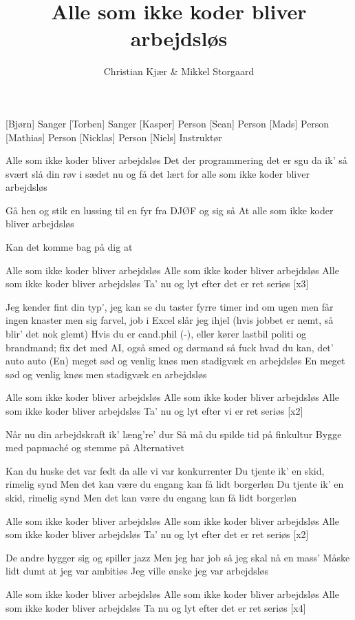 \documentclass[a4paper,11pt]{article}
\title{Alle som ikke koder bliver arbejdsløs}
\author{Christian Kjær \& Mikkel Storgaard}
\begin{document}
\maketitle

\begin{roles}
[Bjørn] Sanger
[Torben] Sanger
[Kasper] Person
[Sean] Person
[Mads] Person
[Mathias] Person
[Nicklas] Person
[Niels] Instruktør
\end{roles}

\begin{song}
%
Alle som ikke koder bliver arbejdsløs
Det der programmering det er sgu da ik' så svært
slå din røv i sædet nu og få det lært
for alle som ikke koder bliver arbejdsløs

Gå hen og stik en lussing til en fyr fra DJØF
og sig så
At alle som ikke koder bliver arbejdsløs

Kan det komme bag på dig at

Alle som ikke koder bliver arbejdsløs
Alle som ikke koder bliver arbejdsløs
Alle som ikke koder bliver arbejdsløs
Ta' nu og lyt efter det er ret seriøs
[x3]

Jeg kender fint din typ', jeg kan se du taster
fyrre timer ind om ugen men får ingen knaster
men sig farvel, job i Excel slår jeg ihjel
(hvis jobbet er nemt, så blir' det nok glemt)
Hvis du er cand.phil (-), eller kører lastbil
politi og brandmand; fix det med AI, også smed og dørmand
så fuck hvad du kan, det' auto auto
(En) meget sød og venlig knøs men stadigvæk en arbejdsløs
En meget sød og venlig knøs men stadigvæk en arbejdsløs

Alle som ikke koder bliver arbejdsløs
Alle som ikke koder bliver arbejdsløs
Alle som ikke koder bliver arbejdsløs
Ta' nu og lyt efter vi er ret seriøs
[x2]

Når nu din arbejdskraft ik' læng're' dur
Så må du spilde tid på finkultur
Bygge med papmaché og stemme på Alternativet

Kan du huske det var fedt da alle vi var konkurrenter
Du tjente ik' en skid, rimelig synd
Men det kan være du engang kan få lidt borgerløn
Du tjente ik' en skid, rimelig synd
Men det kan være du engang kan få lidt borgerløn

Alle som ikke koder bliver arbejdsløs
Alle som ikke koder bliver arbejdsløs
Alle som ikke koder bliver arbejdsløs
Ta' nu og lyt efter det er ret seriøs
[x2]

De andre hygger sig og spiller jazz
Men jeg har job så jeg skal nå en mass'
Måske lidt dumt at jeg var ambitiøs
Jeg ville ønske jeg var arbejdsløs

Alle som ikke koder bliver arbejdsløs
Alle som ikke koder bliver arbejdsløs
Alle som ikke koder bliver arbejdsløs
Ta nu og lyt efter det er ret seriøs
[x4]
\end{song}
\end{document}
